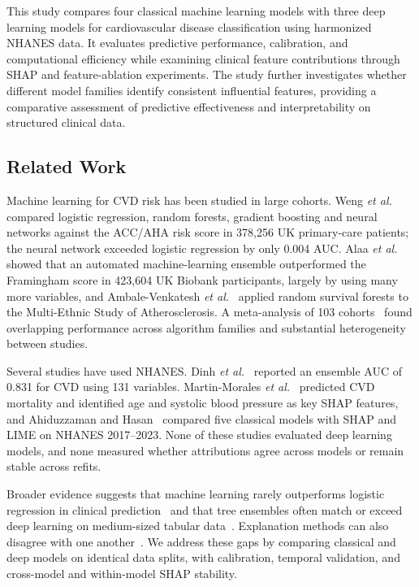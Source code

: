 \documentclass[journal]{IEEEtran}
\begin{document}
This study compares four classical machine learning models with three deep learning models for cardiovascular disease classification using harmonized NHANES data. It evaluates predictive performance, calibration, and computational efficiency while examining clinical feature contributions through SHAP and feature-ablation experiments. The study further investigates whether different model families identify consistent influential features, providing a comparative assessment of predictive effectiveness and interpretability on structured clinical data.

\subsection{Related Work}
Machine learning for CVD risk has been studied in large cohorts. Weng \textit{et al.}~\cite{weng2017} compared logistic regression, random forests, gradient boosting and neural networks against the ACC/AHA risk score in 378{,}256 UK primary-care patients; the neural network exceeded logistic regression by only 0.004 AUC. Alaa \textit{et al.}~\cite{alaa2019} showed that an automated machine-learning ensemble outperformed the Framingham score in 423{,}604 UK Biobank participants, largely by using many more variables, and Ambale-Venkatesh \textit{et al.}~\cite{ambale2017} applied random survival forests to the Multi-Ethnic Study of Atherosclerosis. A meta-analysis of 103 cohorts~\cite{krittanawong2020} found overlapping performance across algorithm families and substantial heterogeneity between studies.

Several studies have used NHANES. Dinh \textit{et al.}~\cite{dinh2019} reported an ensemble AUC of 0.831 for CVD using 131 variables. Martin-Morales \textit{et al.}~\cite{martinmorales2023} predicted CVD mortality and identified age and systolic blood pressure as key SHAP features, and Ahiduzzaman and Hasan~\cite{ahiduzzaman2025} compared five classical models with SHAP and LIME on NHANES 2017--2023. None of these studies evaluated deep learning models, and none measured whether attributions agree across models or remain stable across refits.

Broader evidence suggests that machine learning rarely outperforms logistic regression in clinical prediction~\cite{christodoulou2019} and that tree ensembles often match or exceed deep learning on medium-sized tabular data~\cite{grinsztajn2022,shwartzziv2022}. Explanation methods can also disagree with one another~\cite{krishna2024}. We address these gaps by comparing classical and deep models on identical data splits, with calibration, temporal validation, and cross-model and within-model SHAP stability.
\end{document}
